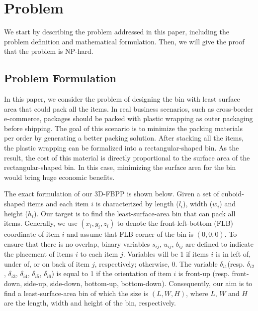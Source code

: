 \section{Problem}
\label{sec:problem}
We start by describing the problem addressed in this paper, including the problem definition and mathematical formulation. Then, we will give the proof that the problem is NP-hard.
\subsection{Problem Formulation}
In this paper, we consider the problem of designing the bin with least surface area that could pack all the items. %
In real business scenarios, such as cross-border e-commerce, packages should be packed with plastic wrapping as outer packaging before shipping. The goal of this scenario is to minimize the  packing materials per order by generating a better packing solution. 
After stacking all the items, the plastic wrapping can be formalized into a rectangular-shaped bin. As the result, the cost of this material is directly proportional to the surface area of the rectangular-shaped bin. In this case, minimizing the surface area for the bin would bring huge economic benefits.

The exact formulation of our 3D-FBPP is shown below. Given a set of cuboid-shaped items and each item $i$ is characterized by length ($l_i$), width ($w_i$) and height ($h_i$). Our target is to find the least-surface-area bin that can pack all items. 
Generally, we use $(x_i, y_i, z_i)$ to denote the front-left-bottom (FLB) coordinate of item $i$ and assume that FLB corner of the bin is $(0,0,0)$.  
To ensure that there is no overlap, binary variables $s_{ij}$, $u_{ij}$, $b_{ij}$ are defined to indicate the placement of items $i$ to each item $j$. Variables will be 1 if items $i$  is in left of, under of, or on back of item $j$, respectively; otherwise, 0. The variable ${\delta}_{i1}$(resp. ${\delta}_{i2}$, ${\delta}_{i3}$, ${\delta}_{i4}$, ${\delta}_{i5}$, ${\delta}_{i6}$) is equal to 1 if the orientation of item $i$ is front-up (resp. front-down, side-up, side-down, bottom-up, bottom-down). Consequently, our aim is to find a least-surface-area bin of which the size is $(L,W,H)$, where $L$, $W$ and $H$ are the length, width and height of the bin, respectively. 


